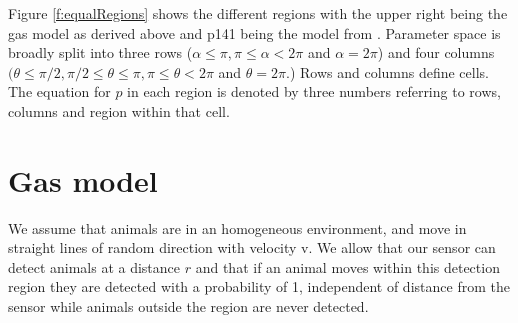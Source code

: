 \begin{comment}
        \begin{itemize}
                \item \ref{p331}: {\bf  p331}
                \item \ref{p332}: {\bf  p332}
                \item \ref{p333}: {\bf  p333}
        \end{itemize}
        \item \ref{p141}: {\bf  p141}
        \item \ref{p24}: {\bf  p24}
        \begin{itemize}
                \item \ref{p241}: {\bf  p241}
                \item \ref{p242}: {\bf  p242}
                \item \ref{p243}: {\bf  p243}
        \end{itemize}
        \item \ref{p34}: {\bf  p34}
        \begin{itemize}
                \item \ref{p341}: {\bf  p341}
                \item \ref{p342}: {\bf  p342}
                \item \ref{p343}: {\bf  p343}
        \end{itemize}
\end{itemize}

\end{comment}

Figure \ref{f:equalRegions} shows the different regions with the upper right being the gas model as derived above and p141 being the model from \citep{rowcliffe2008estimating}. Parameter space is broadly split into three rows ($\alpha \le \pi, \pi \le \alpha < 2\pi$ and $\alpha = 2\pi$) and four columns $(\theta \le \pi/2,  \pi/2 \le \theta \le \pi,  \pi \le \theta < 2\pi$ and $\theta = 2\pi$.) Rows and columns define cells. The equation for $p$ in each region is denoted by three numbers referring to rows, columns and region within that cell.


\section{Gas model} \label{gas}

We assume that animals are in an homogeneous environment, and move in straight lines of random direction with velocity v. We allow that our sensor can detect animals at a distance $r$ and that if an animal moves within this detection region they are detected with a probability of 1, independent of distance from the sensor while animals outside the region are never detected.

